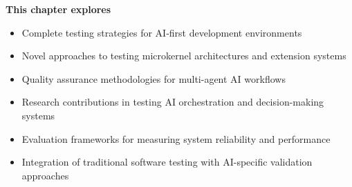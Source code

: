 \begin{tcolorbox}[
    enhanced,
    colback=white,
    colframe=brandPrimary!40,
    boxrule=1pt,
    arc=12pt,
    drop shadow={brandPrimary!20},
    left=1.5cm,
    right=1.5cm,
    top=1.2cm,
    bottom=1.2cm,
    before upper={\parindent0pt}
]
\begin{center}
{\Large\textbf{\textcolor{brandPrimary}{This chapter explores}}}
\end{center}

\vspace{0.8cm}

\begin{itemize}[leftmargin=1.2cm, itemsep=0.4cm, label={\textcolor{brandAccent}{$\triangleright$}}]
    \item {\large Complete testing strategies for AI-first development environments}
    \item {\large Novel approaches to testing microkernel architectures and extension systems}
    \item {\large Quality assurance methodologies for multi-agent AI workflows}
    \item {\large Research contributions in testing AI orchestration and decision-making systems}
    \item {\large Evaluation frameworks for measuring system reliability and performance}
    \item {\large Integration of traditional software testing with AI-specific validation approaches}
\end{itemize}
\end{tcolorbox}

\clearpage
